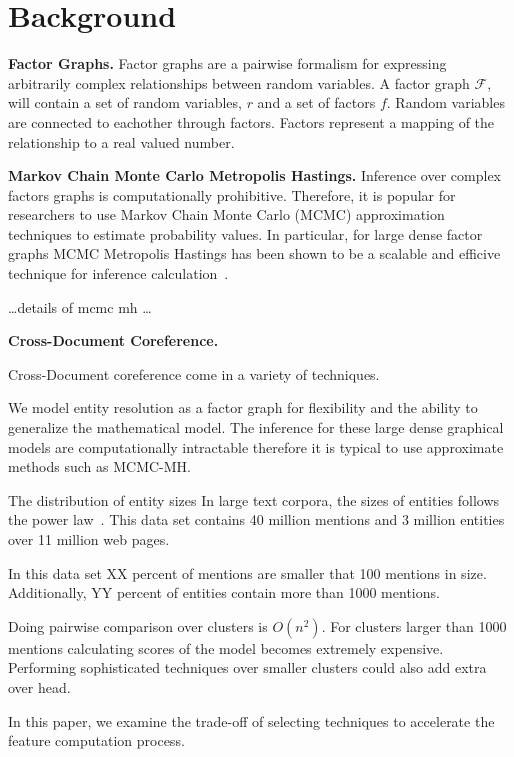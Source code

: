 
\section{Background}

\textbf{Factor Graphs.}
Factor graphs are a pairwise formalism for expressing arbitrarily complex
relationships between random variables.
A factor graph $\mathcal{F}$, will contain a set of random variables, $r$
and a set of factors $f$. Random variables are connected to eachother
through factors. Factors represent a mapping of the relationship to a 
real valued number.


\textbf{Markov Chain Monte Carlo Metropolis Hastings.}
Inference over complex factors graphs is computationally prohibitive.
Therefore, it is popular for researchers to use Markov Chain Monte Carlo (MCMC) 
approximation techniques to estimate probability values.
In particular, for large dense factor graphs MCMC Metropolis Hastings has
been shown to be a scalable and efficive technique for 
inference calculation~\cite{singh2011large}.

\ldots details of mcmc mh \ldots



\textbf{Cross-Document Coreference.}

Cross-Document coreference come in a variety of techniques.

We model entity resolution as a factor graph for flexibility and the ability
to generalize the mathematical model.
The inference for these large dense graphical models are computationally
intractable therefore it is typical to use approximate methods such as MCMC-MH\@.


The distribution of entity sizes
In large text corpora, the sizes of entities follows the power law~\cite{singh12:wiki-links}.
This data set contains 40 million mentions and 3 million entities 
over 11 million web pages.

In this data set XX percent of mentions are smaller that 100 mentions in size.
Additionally, YY percent of entities contain more than 1000 mentions.

Doing pairwise comparison over clusters is $O(n^2)$.
For clusters larger than 1000 mentions calculating scores of the model
becomes extremely expensive.
Performing sophisticated techniques over smaller clusters could also 
add extra over head.

In this paper, we examine the trade-off of selecting techniques to
accelerate the feature computation process.



